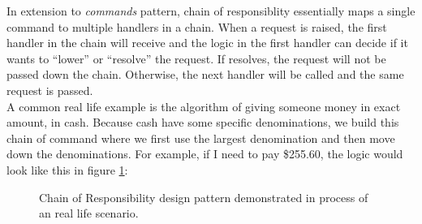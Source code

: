 \begin{multicols}{2}
In extension to \textit{commands} pattern, chain of responsiblity essentially maps a single command to multiple handlers in a chain. When a request is raised, the first handler in the chain will receive and the logic in the first handler can decide if it wants to ``lower'' or ``resolve'' the request. If resolves, the request will not be passed down the chain. Otherwise, the next handler will be called and the same request is passed.\bs
\\
A common real life example is the algorithm of giving someone money in exact amount, in cash. Because cash have some specific denominations, we build this chain of command where we first use the largest denomination and then move down the denominations. For example, if I need to pay \$255.60, the logic would look like this in figure \ref{fig:chain-pay}:

\begin{figure}[H]
	\centering


	\caption{Chain of Responsibility design pattern demonstrated in process of an real life scenario.}
	\label{fig:chain-pay}
\end{figure}


\end{multicols}
